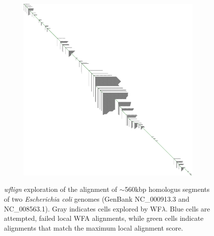 \begin{figure}[ht!]
    \begin{subfigure}{\linewidth}
        \centering
        \includegraphics[width=1.0\linewidth, trim=-0cm 2cm 0 0cm]{fig/wflign.png}
        \label{fig:bad-sorting}
    \end{subfigure}
    \caption{
      \textit{wflign} exploration of the alignment of $\sim$560kbp homologus segments of two \textit{Escherichia coli} genomes (GenBank NC\_000913.3 and NC\_008563.1).
      Gray indicates cells explored by WF$\lambda$.
      Blue cells are attempted, failed local WFA alignments, while green cells indicate alignments that match the maximum local alignment score.
    }
    \label{fig:wflambda}
\end{figure}
